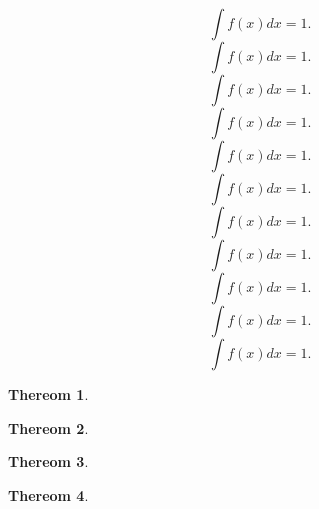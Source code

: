 \documentclass{article}
\newtheorem{theorem}{Thereom}
\begin{document}
  \begin{equation}
    \label{eq:1}
    \int f(x) dx = 1.
  \end{equation}
  \begin{equation}
    \label{eq:2}
    \int f(x) dx = 1.
  \end{equation}
  \begin{equation}
    \label{eq:3}
    \int f(x) dx = 1.
  \end{equation}
  \begin{equation}
    \label{eq:4}
    \int f(x) dx = 1.
  \end{equation}
  \begin{equation}
    \label{eq:5}
    \int f(x) dx = 1.
  \end{equation}
  \begin{equation}
    \label{eq:6}
    \int f(x) dx = 1.
  \end{equation}
  \begin{equation}
    \label{eq:7}
    \int f(x) dx = 1.
  \end{equation}
  \begin{equation}
    \label{eq:8}
    \int f(x) dx = 1.
  \end{equation}
  \begin{equation}
    \label{eq:9}
    \int f(x) dx = 1.
  \end{equation}
  \begin{equation}
    \label{eq:10}
    \int f(x) dx = 1.
  \end{equation}
  \begin{equation}
    \label{eq:11}
    \int f(x) dx = 1.
  \end{equation}
  
  \begin{theorem}
    \label{result:theorem 1}
  \end{theorem}
  \begin{theorem}
    \label{result:theorem 2}
  \end{theorem}
  \begin{theorem}
    \label{result:theorem 3}
  \end{theorem}
  \begin{theorem}
    \label{result:theorem 4}
  \end{theorem}
  
\end{document}
